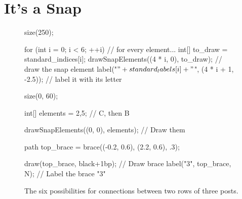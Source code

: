 \documentclass[../textbook.tex]{subfiles}
\begin{document}
\section{It's a Snap}

\newcommand\snap{\bullet} %

\begin{figure}[h]
	\begin{center}
		\begin{minipage}[b]{\textwidth}
			\centering
			\begin{asy}[width=0.5\textwidth]
				size(250);

				for (int i = 0; i < 6; ++i) { // for every element...
					int[] to_draw = {standard_indices[i]};
					drawSnapElements((4 * i, 0), to_draw); // draw the snap element
					label("$" + standard_labels[i] + "$", (4 * i + 1, -2.5)); // label it with its letter
				}
			\end{asy}
		\end{minipage}
	\end{center}
	\vspace*{-2\baselineskip}
	\begin{center}
		\begin{minipage}[t]{\textwidth}
			\caption{The six possibilities for connections between two rows of three posts.}
			\label{fig:all_3_cols}
		\end{minipage}
	\end{center}

	\begin{center}
		\begin{minipage}[b]{0.45\textwidth}
			\centering
			\begin{asy}[width=0.3\textwidth]
				size(0, 60);

				int[] elements = {2,5}; // C, then B

				drawSnapElements((0, 0), elements); // Draw them

				path top_brace = brace((-0.2, 0.6), (2.2, 0.6), .3);

				draw(top_brace, black+1bp); // Draw brace
				label("$3$", top_brace, N); // Label the brace "3"


\end{asy}
\end{minipage}
\end{center}
\end{figure}
\end{document}
